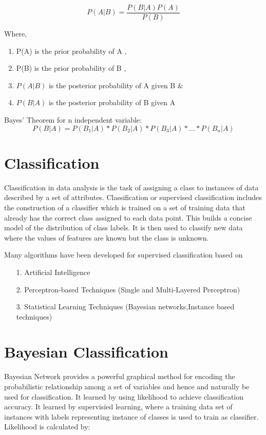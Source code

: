 \[P(A|B)=\frac{P(B|A)P(A)}{P(B)}\]

Where,
\begin{enumerate}
\item P(A) is the prior probability of A , 
\item P(B) is the prior probability of B ,
\item $P(A | B)$ is the posterior probability of A given B \&
\item $P(B | A)$ is the posterior probability of B given A
\end{enumerate}

\par 
Bayes' Theorem for n independent variable:
\textbf{\[P(B|A)=P(B_1|A)*P(B_2|A)*P(B_3|A)*...*P(B_n|A)\]}

\section{Classification}
\par
Classification in data analysis is the task of assigning a class to instances of data described by a set of attributes. Classification or supervised classification includes the construction of a classifier which is trained on a set of training data
that already has the correct class assigned to each data point. This builds a concise model of the distribution of 
class labels. It is then used to classify new data where the values of features are known but the class is unknown.
\par
Many algorithms have been developed for supervised classification based on
\begin{itemize}
	\item[1.] Artificial Intelligence
	\item[2.] Perceptron-based Techniques (Single and Multi-Layered Perceptron)
	\item[3.] Statistical Learning Techniques (Bayesian networks,Instance based techniques)
\end{itemize}


\section{Bayesian Classification}
\par
Bayesian Network provides a powerful graphical method for encoding the probabilistic relationship among a set of variables and hence and naturally be used for classification. It learned by using likelihood to achieve classification accuracy. It learned by supervisied learning, where a  training data set of instances with labels representing instance of classes is used to train as classifier.\cite{garg2013design}
\linebreak Likelihood is calculated by:

